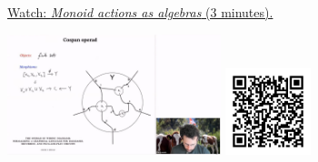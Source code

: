 
\begin{minipage}{10cm}
    \href{https://act4e-spring21.netlify.app/videos/spring2021-operads-b:monoid-act-algebras.html}{Watch: \emph{Monoid actions as algebras} (3 minutes).}
        
    \href{https://act4e-spring21.netlify.app/videos/spring2021-operads-b:monoid-act-algebras.html}{\includegraphics[height=3.5cm]{spring2021-operads-b:monoid-act-algebras/thumbnails.jpg}}
    \href{https://act4e-spring21.netlify.app/videos/spring2021-operads-b:monoid-act-algebras.html}{\includegraphics[height=2.5cm]{spring2021-operads-b:monoid-act-algebras/qrcode.png}}
\end{minipage}
